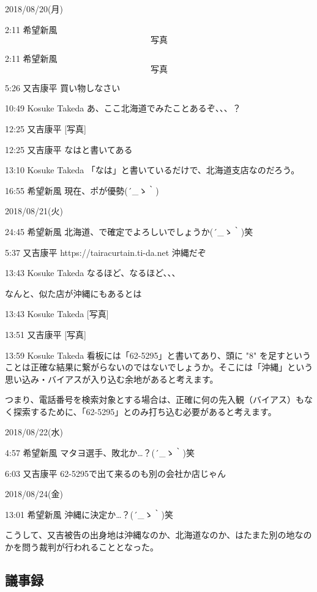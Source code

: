 2018/08/20(月)\par
\par
2:11	希望新風	\[写真\] \par
2:11	希望新風	\[写真\] \par
5:26	又吉康平	買い物しなさい\par
10:49	Kosuke Takeda	あ、ここ北海道でみたことあるぞ、、、？\par
12:25	又吉康平	[写真]\par
12:25	又吉康平	なはと書いてある\par
13:10	Kosuke Takeda	「なは」と書いているだけで、北海道支店なのだろう。\par
16:55	希望新風	現在、ポが優勢{\sf (´\_ゝ｀)}\par
\par
2018/08/21(火)\par
\par
24:45	希望新風	北海道、で確定でよろしいでしょうか{\sf (´\_ゝ｀)}笑\par
5:37	又吉康平	https://tairacurtain.ti-da.net 沖縄だぞ\par
13:43	Kosuke Takeda	なるほど、なるほど、、、\par
なんと、似た店が沖縄にもあるとは\par
13:43	Kosuke Takeda	[写真]\par
13:51	又吉康平	[写真]\par
13:59	Kosuke Takeda	看板には「62-5295」と書いてあり、頭に "8" を足すということは正確な結果に繋がらないのではないでしょうか。そこには「沖縄」という思い込み・バイアスが入り込む余地があると考えます。\par
つまり、電話番号を検索対象とする場合は、正確に何の先入観（バイアス）もなく探索するために、「62-5295」とのみ打ち込む必要があると考えます。\par
2018/08/22(水)\par
\par
4:57	希望新風	マタヨ選手、敗北か…？{\sf (´\_ゝ｀)}笑\par
6:03	又吉康平	62-5295で出て来るのも別の会社か店じゃん\par
2018/08/24(金)\par
\par
13:01	希望新風	沖縄に決定か…？{\sf (´\_ゝ｀)}笑\par

こうして、又吉被告の出身地は沖縄なのか、北海道なのか、はたまた別の地なのかを問う裁判が行われることとなった。


\subsection{議事録}

